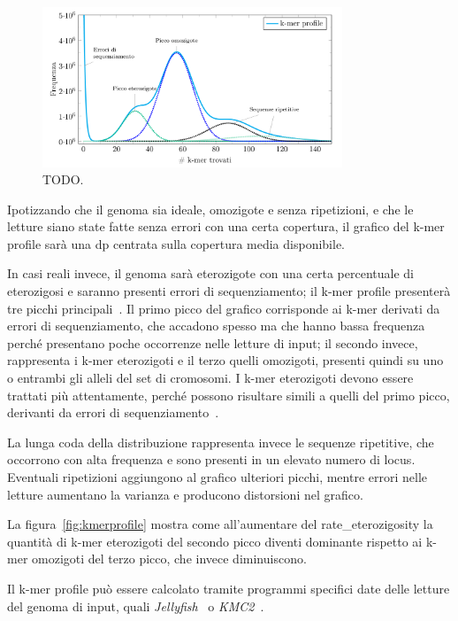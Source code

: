 \documentclass[crop=false, class=book]{standalone}
\begin{document}
	
	\begin{figure}
		\centering
		\includegraphics[width=0.8\textwidth]{capitoli/introduzione/profilecomp.png}
		\caption{TODO.}
		\label{fig:profilecomp}
	\end{figure}
	
	Ipotizzando che il genoma sia ideale, omozigote e senza ripetizioni, e che le letture siano state fatte senza errori con una certa copertura, il grafico del k-mer profile sarà una \gls{dp} centrata sulla copertura media disponibile.
	
	In casi reali invece, il genoma sarà eterozigote con una certa percentuale di eterozigosi e saranno presenti errori di sequenziamento; il k-mer profile presenterà tre picchi principali~\cite{sun2017findGSE}.
	Il primo picco del grafico corrisponde ai k-mer derivati da errori di sequenziamento, che accadono spesso ma che hanno bassa frequenza perché presentano poche occorrenze nelle letture di input; il secondo invece, rappresenta i k-mer eterozigoti e il terzo quelli omozigoti, presenti quindi su uno o entrambi gli alleli del set di cromosomi. I k-mer eterozigoti devono essere trattati più attentamente, perché possono risultare simili a quelli del primo picco, derivanti da errori di sequenziamento~\cite{sohn2016present}.	
	
	La lunga coda della distribuzione rappresenta invece le sequenze ripetitive, che occorrono con alta frequenza e sono presenti in un elevato numero di \gls{locus}. Eventuali ripetizioni aggiungono al grafico ulteriori picchi, mentre errori nelle letture aumentano la varianza e producono distorsioni nel grafico.
	
	La figura~\vref{fig:kmerprofile} mostra come all'aumentare del \gls{rate_eterozigosity} la quantità di k-mer eterozigoti del secondo picco diventi dominante rispetto ai k-mer omozigoti del terzo picco, che invece diminuiscono.
	
	Il k-mer profile può essere calcolato tramite programmi specifici date delle letture del genoma di input, quali \textit{Jellyfish}~\cite{marcais2011fast} o \textit{KMC2}~\cite{deorowicz2015KMC}.
	
\end{document}
